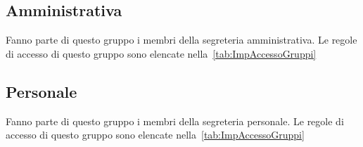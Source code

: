 \subsection{Amministrativa}
Fanno parte di questo gruppo i membri della segreteria amministrativa. Le  regole di accesso di questo gruppo sono elencate nella~\cref{tab:ImpAccessoGruppi}
\subsection{Personale}
Fanno parte di questo gruppo i membri della segreteria personale. Le  regole di accesso di questo gruppo sono elencate nella~\cref{tab:ImpAccessoGruppi}
